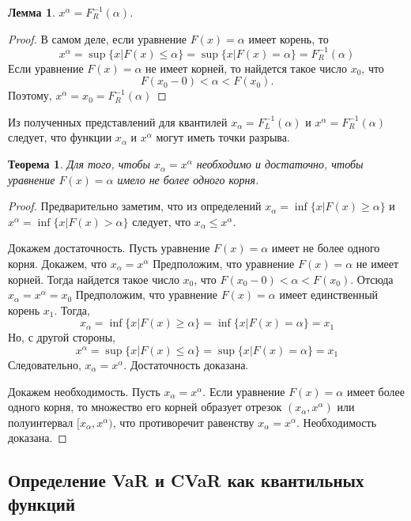 \documentclass[14pt,a4paper]{article}
\theoremstyle{plain}
\newtheorem{Th}{Теорема}[section]
\newtheorem{Lemma}{Лемма}[section]
\theoremstyle{definition}
\begin{document}
\begin{Lemma}
$x^{\alpha} = F^{-1}_{R}(\alpha)$.
\end{Lemma}

\begin{proof}
В самом деле, если уравнение $F(x)=\alpha$ имеет корень, то
$$
x^{\alpha} = \sup \{x|F(x) \le \alpha \} = \sup \{x|F(x) = \alpha \} = F^{-1}_{R}(\alpha)
$$
Если уравнение $F(x)=\alpha$ не имеет корней, то найдется такое число $x_0$, что $$F(x_0-0)<\alpha<F(x_0).$$ Поэтому, $x^{\alpha} = x_0 = F^{-1}_{R}(\alpha)$
\end{proof}

Из полученных представлений для квантилей $x_{\alpha} = F^{-1}_{L}(\alpha)$ и $x^{\alpha} = F^{-1}_{R}(\alpha)$ следует, что функции $x_{\alpha}$ и $x^{\alpha}$ могут иметь точки разрыва.
\begin{Th} \label{main}
Для того, чтобы $x_{\alpha}=x^{\alpha}$ необходимо и достаточно, чтобы уравнение $F(x)=\alpha$ имело не более одного корня.
\end{Th}
\begin{proof}
Предварительно заметим, что из определений $x_{\alpha} = \inf \{x|F(x) \ge \alpha \}$
и $
x^{\alpha} = \inf \{x|F(x) > \alpha \}
$
следует, что  $x_{\alpha} \le x^{\alpha}.$

 Докажем достаточность. Пусть уравнение $F(x)=\alpha$ имеет не более одного корня.  Докажем, что $x_{\alpha}=x^{\alpha}$
Предположим, что уравнение $F(x)=\alpha$ не имеет корней.
Тогда найдется такое число $x_0$, что $F(x_0-0) < \alpha < F(x_0)$. Отсюда $x_{\alpha}=x^{\alpha}=x_0$
Предположим, что уравнение $F(x)=\alpha$ имеет единственный корень $x_1$.
Тогда,
$$
x_{\alpha} = \inf \{x|F(x) \ge \alpha \} = \inf \{x|F(x)=\alpha  \} = x_1
$$
Но, с другой стороны,
$$
x^{\alpha} = \sup \{x|F(x) \le \alpha \} = \sup\{x|F(x)=\alpha \} =x_1
$$
Следовательно, $x_{\alpha}=x^{\alpha}$. Достаточность доказана.

 Докажем необходимость.
Пусть $x_{\alpha}=x^{\alpha}$. Если уравнение $F(x) =  \alpha$ имеет более одного корня, то множество его корней образует отрезок $(x_{\alpha}, x^{\alpha})$ или полуинтервал  $[x_{\alpha}, x^{\alpha})$, что противоречит равенству $x_{\alpha}=x^{\alpha}$. Необходимость доказана.
\end{proof}

 \subsection{Определение VaR и CVaR как квантильных функций}
\end{document}
